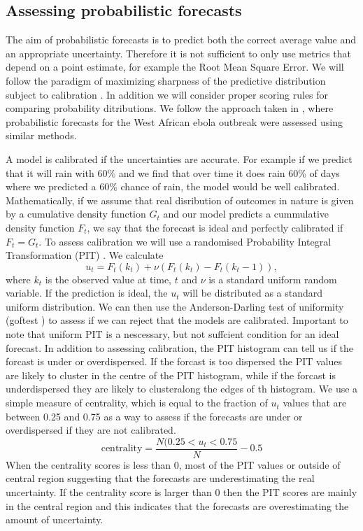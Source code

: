 \documentclass[12pt]{article}
\begin{document}
\subsection{Assessing probabilistic forecasts}
The aim of probabilistic forecasts is to predict both the correct average value and an appropriate uncertainty. Therefore it is not sufficient to only use metrics that depend on a point estimate, for example the Root Mean Square Error. We will follow the paradigm of maximizing sharpness of the predictive distribution subject to calibration \cite{gneitingProbabilisticForecastsCalibration2007}. In addition we will consider proper scoring rules for comparing probability ditributions. We follow the approach taken in \cite{funkAssessingPerformanceRealtime2019}, where probabilistic forecasts for the West African ebola outbreak were assessed using similar methods.

A model is calibrated if the uncertainties are accurate. For example if we predict that it will rain with 60\% and we find that over time it does rain 60\% of days where we predicted a 60\% chance of rain, the model would be well calibrated. Mathematically, if we assume that real disribution of outcomes in nature is given by a cumulative density function $G_t$ and our model predicts a cummulative density function $F_t$, we say that the forecast is ideal and perfectly calibrated if $F_t=G_t$. To assess calibration we will use a randomised Probability Integral Transformation (PIT) \cite{czadoPredictiveModelAssessment2009a}. We calculate
\[ u_t = F_t(k_t) + \nu (F_t(k_t) - F_t(k_t -1)),\]
where $k_t$ is the observed value at time, $t$ and $\nu$ is a standard uniform random variable. If the prediction is ideal, the $u_t$ will be distributed as a standard uniform distribution. We can then use the Anderson-Darling test of uniformity (goftest \cite{farawayGoftestClassicalGoodnessofFit2017}) to assess if we can reject that the models are calibrated. Important to note that uniform PIT is a nescessary, but not suffcient condition for an ideal forecast. In addition to assessing calibration, the PIT histogram can tell us if the forcast is under or overdispersed. If the forcast is too dispersed the PIT values are likely to cluster in the centre of the PIT histogram, while if the forcast is underdispersed they are likely to clusteralong the edges of th histogram. We use a simple measure of centrality, which is equal to the fraction of $u_t$ values that are between 0.25 and 0.75 as a way to assess if the forecasts are under or overdispersed if they are not calibrated.
\[\text{centrality} = \frac{N(0.25 < u_t < 0.75}{N} - 0.5\]
When the centrality scores is less than 0, most of the PIT values or outside of central region suggesting that the forecasts are underestimating the real uncertainty.  If the centrality score is larger than 0 then the PIT scores are mainly in the central region and this indicates that the forecasts are overestimating the amount of uncertainty. 
\end{document}
